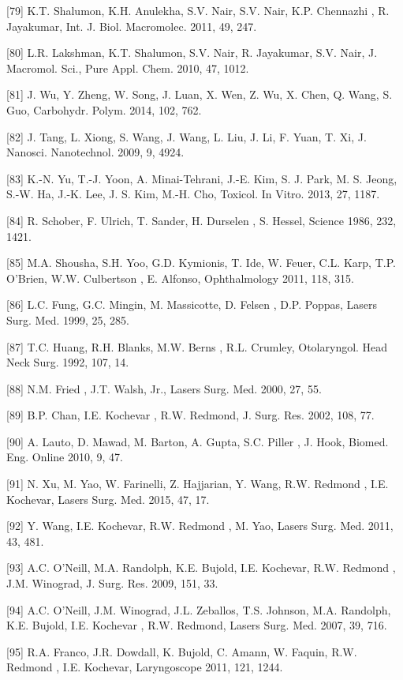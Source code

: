[79]	K.T. Shalumon, K.H. Anulekha, S.V. Nair, S.V. Nair, K.P. Chennazhi , R. Jayakumar, Int. J. Biol. Macromolec. 2011, 49, 247.

[80]	L.R. Lakshman, K.T. Shalumon, S.V. Nair, R. Jayakumar, S.V. Nair, J. Macromol. Sci., Pure Appl. Chem. 2010, 47, 1012.

[81]	J. Wu, Y. Zheng, W. Song, J. Luan, X. Wen, Z. Wu, X. Chen, Q. Wang, S. Guo, Carbohydr. Polym. 2014, 102, 762.

[82]	J. Tang, L. Xiong, S. Wang, J. Wang, L. Liu, J. Li, F. Yuan, T. Xi, J. Nanosci. Nanotechnol. 2009, 9, 4924.

[83]	K.-N. Yu, T.-J. Yoon, A. Minai-Tehrani, J.-E. Kim, S. J. Park, M. S. Jeong, S.-W. Ha, J.-K. Lee, J. S. Kim, M.-H. Cho, Toxicol. In Vitro. 2013, 
27, 1187.

[84]	R. Schober, F. Ulrich, T. Sander, H. Durselen , S. Hessel, Science 1986, 232, 1421.

[85]	M.A. Shousha, S.H. Yoo, G.D. Kymionis, T. Ide, W. Feuer, C.L. Karp, T.P. O'Brien, W.W. Culbertson , E. Alfonso, Ophthalmology 2011, 118, 315.

[86]	L.C. Fung, G.C. Mingin, M. Massicotte, D. Felsen , D.P. Poppas, Lasers Surg. Med. 1999, 25, 285.

[87]	T.C. Huang, R.H. Blanks, M.W. Berns , R.L. Crumley, Otolaryngol. Head Neck Surg. 1992, 107, 14.

[88]	N.M. Fried , J.T. Walsh, Jr., Lasers Surg. Med. 2000, 27, 55.

[89]	B.P. Chan, I.E. Kochevar , R.W. Redmond, J. Surg. Res. 2002, 108, 77.

[90]	A. Lauto, D. Mawad, M. Barton, A. Gupta, S.C. Piller , J. Hook, Biomed. Eng. Online 2010, 9, 47.

[91]	N. Xu, M. Yao, W. Farinelli, Z. Hajjarian, Y. Wang, R.W. Redmond , I.E. Kochevar, Lasers Surg. Med. 2015, 47, 17.

[92]	Y. Wang, I.E. Kochevar, R.W. Redmond , M. Yao, Lasers Surg. Med. 2011, 43, 481.

[93]	A.C. O'Neill, M.A. Randolph, K.E. Bujold, I.E. Kochevar, R.W. Redmond , J.M. Winograd, J. Surg. Res. 2009, 151, 33.

[94]	A.C. O'Neill, J.M. Winograd, J.L. Zeballos, T.S. Johnson, M.A. Randolph, K.E. Bujold, I.E. Kochevar , R.W. Redmond, Lasers Surg. Med. 2007, 39, 
716.

[95]	R.A. Franco, J.R. Dowdall, K. Bujold, C. Amann, W. Faquin, R.W. Redmond , I.E. Kochevar, Laryngoscope 2011, 121, 1244.

